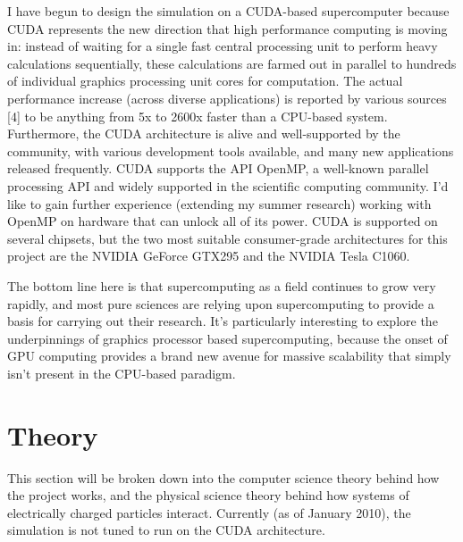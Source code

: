 \documentclass[10pt]{article}
\begin{document}
I have begun to design the simulation on a CUDA-based supercomputer because CUDA represents the new direction that high performance computing is moving in: instead of waiting for a single fast central processing unit to perform heavy calculations sequentially, these calculations are farmed out in parallel to hundreds of individual graphics processing unit cores for computation. The actual performance increase (across diverse applications) is reported by various sources [4] to be anything from 5x to 2600x faster than a CPU-based system. Furthermore, the CUDA architecture is alive and well-supported by the community, with various development tools available, and many new applications released frequently. CUDA supports the API OpenMP, a well-known parallel processing API and widely supported in the scientific computing community. I'd like to gain further experience (extending my summer research) working with OpenMP on hardware that can unlock all of its power. CUDA is supported on several chipsets, but the two most suitable consumer-grade architectures for this project are the NVIDIA GeForce GTX295 and the NVIDIA Tesla C1060. 

The bottom line here is that supercomputing as a field continues to grow very rapidly, and most pure sciences are relying upon supercomputing to provide a basis for carrying out their research. It's particularly interesting to explore the underpinnings of graphics processor based supercomputing, because the onset of GPU computing provides a brand new avenue for massive scalability that simply isn't present in the CPU-based paradigm.

\section{Theory}
This section will be broken down into the computer science theory behind how the project works, and the physical science theory behind how systems of electrically charged particles interact. Currently (as of January 2010), the simulation is not tuned to run on the CUDA architecture.
\end{document}
